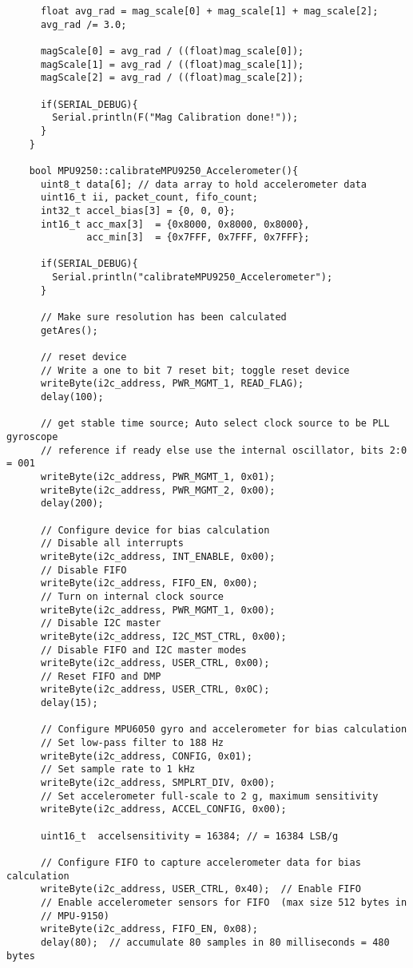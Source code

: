 \begin{lstlisting}
	  float avg_rad = mag_scale[0] + mag_scale[1] + mag_scale[2];
	  avg_rad /= 3.0;

	  magScale[0] = avg_rad / ((float)mag_scale[0]);
	  magScale[1] = avg_rad / ((float)mag_scale[1]);
	  magScale[2] = avg_rad / ((float)mag_scale[2]);

	  if(SERIAL_DEBUG){
	    Serial.println(F("Mag Calibration done!"));
	  }
	}

	bool MPU9250::calibrateMPU9250_Accelerometer(){
	  uint8_t data[6]; // data array to hold accelerometer data
	  uint16_t ii, packet_count, fifo_count;
	  int32_t accel_bias[3] = {0, 0, 0};
	  int16_t acc_max[3]  = {0x8000, 0x8000, 0x8000},
	          acc_min[3]  = {0x7FFF, 0x7FFF, 0x7FFF};

	  if(SERIAL_DEBUG){
	    Serial.println("calibrateMPU9250_Accelerometer");
	  }

	  // Make sure resolution has been calculated
	  getAres();

	  // reset device
	  // Write a one to bit 7 reset bit; toggle reset device
	  writeByte(i2c_address, PWR_MGMT_1, READ_FLAG);
	  delay(100);

	  // get stable time source; Auto select clock source to be PLL gyroscope
	  // reference if ready else use the internal oscillator, bits 2:0 = 001
	  writeByte(i2c_address, PWR_MGMT_1, 0x01);
	  writeByte(i2c_address, PWR_MGMT_2, 0x00);
	  delay(200);

	  // Configure device for bias calculation
	  // Disable all interrupts
	  writeByte(i2c_address, INT_ENABLE, 0x00);
	  // Disable FIFO
	  writeByte(i2c_address, FIFO_EN, 0x00);
	  // Turn on internal clock source
	  writeByte(i2c_address, PWR_MGMT_1, 0x00);
	  // Disable I2C master
	  writeByte(i2c_address, I2C_MST_CTRL, 0x00);
	  // Disable FIFO and I2C master modes
	  writeByte(i2c_address, USER_CTRL, 0x00);
	  // Reset FIFO and DMP
	  writeByte(i2c_address, USER_CTRL, 0x0C);
	  delay(15);

	  // Configure MPU6050 gyro and accelerometer for bias calculation
	  // Set low-pass filter to 188 Hz
	  writeByte(i2c_address, CONFIG, 0x01);
	  // Set sample rate to 1 kHz
	  writeByte(i2c_address, SMPLRT_DIV, 0x00);
	  // Set accelerometer full-scale to 2 g, maximum sensitivity
	  writeByte(i2c_address, ACCEL_CONFIG, 0x00);

	  uint16_t  accelsensitivity = 16384; // = 16384 LSB/g

	  // Configure FIFO to capture accelerometer data for bias calculation
	  writeByte(i2c_address, USER_CTRL, 0x40);  // Enable FIFO
	  // Enable accelerometer sensors for FIFO  (max size 512 bytes in
	  // MPU-9150)
	  writeByte(i2c_address, FIFO_EN, 0x08);
	  delay(80);  // accumulate 80 samples in 80 milliseconds = 480 bytes


\end{lstlisting}
